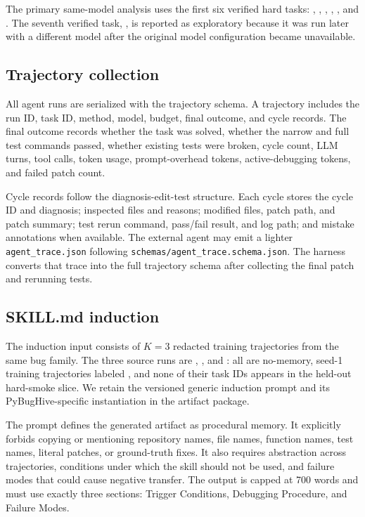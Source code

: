 The primary same-model analysis uses the first six verified hard tasks: , , , , , and . The seventh verified task, , is reported as exploratory because it was run later with a different model after the original model configuration became unavailable.

\subsection{Trajectory collection}
\label{sec:method_trajectories}

All agent runs are serialized with the trajectory schema. A trajectory includes the run ID, task ID, method, model, budget, final outcome, and cycle records. The final outcome records whether the task was solved, whether the narrow and full test commands passed, whether existing tests were broken, cycle count, LLM turns, tool calls, token usage, prompt-overhead tokens, active-debugging tokens, and failed patch count.

Cycle records follow the diagnosis-edit-test structure. Each cycle stores the cycle ID and diagnosis; inspected files and reasons; modified files, patch path, and patch summary; test rerun command, pass/fail result, and log path; and mistake annotations when available. The external agent may emit a lighter \texttt{agent\_trace.json} following \texttt{schemas/agent\_trace.schema.json}. The harness converts that trace into the full trajectory schema after collecting the final patch and rerunning tests.

\subsection{SKILL.md induction}
\label{sec:method_induction}

The induction input consists of $K=3$ redacted training trajectories from the same bug family. The three source runs are , , and : all are no-memory, seed-1 training trajectories labeled , and none of their task IDs appears in the held-out hard-smoke slice. We retain the versioned generic induction prompt and its PyBugHive-specific instantiation in the artifact package.

The prompt defines the generated artifact as procedural memory. It explicitly forbids copying or mentioning repository names, file names, function names, test names, literal patches, or ground-truth fixes. It also requires abstraction across trajectories, conditions under which the skill should not be used, and failure modes that could cause negative transfer. The output is capped at 700 words and must use exactly three sections: Trigger Conditions, Debugging Procedure, and Failure Modes.

